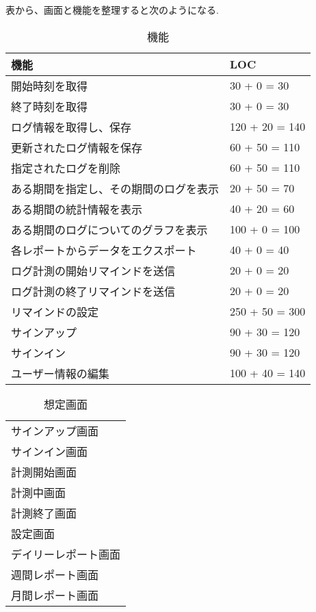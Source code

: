 表から、画面と機能を整理すると次のようになる.

\begin{table}[H]
  \centering
  \caption{機能}
  \begin{tabular}{|l|l|}
  \hline
    機能 & LOC \\
  \hline

  \hline
    開始時刻を取得 & 30 + 0 = 30 \\
  \hline
    終了時刻を取得 & 30 + 0 = 30 \\
  \hline
    ログ情報を取得し、保存 & 120 + 20 = 140 \\
  \hline
    更新されたログ情報を保存 & 60 + 50 = 110 \\
  \hline
    指定されたログを削除 & 60 + 50 = 110 \\
  \hline

  \hline
    ある期間を指定し、その期間のログを表示 & 20 + 50 = 70 \\
  \hline
    ある期間の統計情報を表示 & 40 + 20 = 60 \\
  \hline
    ある期間のログについてのグラフを表示 & 100 + 0 = 100 \\
  \hline
    各レポートからデータをエクスポート & 40 + 0 = 40 \\
  \hline

  \hline
    ログ計測の開始リマインドを送信 & 20 + 0 = 20 \\
  \hline
    ログ計測の終了リマインドを送信 & 20 + 0 = 20 \\
  \hline
    リマインドの設定 & 250 + 50 = 300 \\
  \hline

  \hline
    サインアップ &  90 + 30 = 120 \\
  \hline
    サインイン & 90 + 30 = 120 \\
  \hline
    ユーザー情報の編集 & 100 + 40 = 140 \\
  \hline
  \end{tabular}
\end{table}

\begin{table}[H]
  \centering
  \caption{想定画面}
  \begin{tabular}{|l|}
  \hline
    サインアップ画面  \\
    サインイン画面 \\
    計測開始画面 \\
    計測中画面 \\
    計測終了画面 \\
    設定画面 \\
    デイリーレポート画面 \\
    週間レポート画面 \\
    月間レポート画面 \\
  \hline
  \end{tabular}
\end{table}

